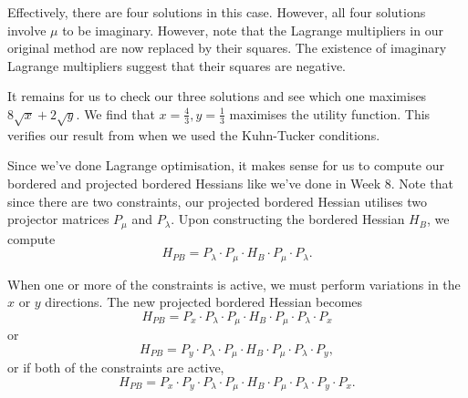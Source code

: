 \documentclass[a4paper, 12pt,oneside,openany]{book}
\begin{document}
{	Effectively, there are four solutions in this case. However, all four solutions involve $\mu$ to be imaginary. However, note that the Lagrange multipliers in our original method are now replaced by their squares. The existence of imaginary Lagrange multipliers suggest that their squares are negative.
	
	It remains for us to check our three solutions and see which one maximises $8\sqrt{x}+2\sqrt{y}$. We find that $x=\frac{4}{3}, y=\frac{1}{3}$ maximises the utility function. This verifies our result from when we used the Kuhn-Tucker conditions.
}

Since we've done Lagrange optimisation, it makes sense for us to compute our bordered and projected bordered Hessians like we've done in Week 8. Note that since there are two constraints, our projected bordered Hessian utilises two projector matrices $P_\mu$ and $P_\lambda$. Upon constructing the bordered Hessian $H_B$, we compute $$H_{PB} = P_\lambda \cdot P_\mu \cdot H_B \cdot P_\mu \cdot P_\lambda.$$

When one or more of the constraints is active, we must perform variations in the $x$ or $y$ directions. The new projected bordered Hessian becomes $$H_{PB} = P_x \cdot P_\lambda \cdot P_\mu \cdot H_B \cdot P_\mu \cdot P_\lambda \cdot P_x$$ or $$H_{PB} = P_y \cdot P_\lambda \cdot P_\mu \cdot H_B \cdot P_\mu \cdot P_\lambda \cdot P_y,$$ or if both of the constraints are active, $$H_{PB} = P_x \cdot P_y \cdot P_\lambda \cdot P_\mu \cdot H_B \cdot P_\mu \cdot P_\lambda \cdot P_y \cdot P_x.$$
\end{document}
